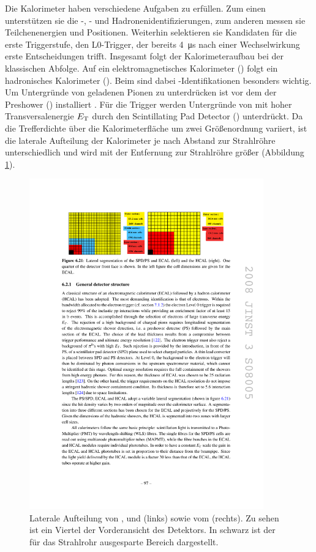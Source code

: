 Die Kalorimeter haben verschiedene Aufgaben zu erfüllen. Zum einen unterstützen sie die \en-, \g- und Hadronenidentifizierungen, zum anderen messen sie Teilchenenergien und Positionen. Weiterhin selektieren sie Kandidaten für die erste Triggerstufe, den L$0$-Trigger, der bereits \SI{4}{\micro s} nach einer Wechselwirkung erste Entscheidungen trifft. Insgesamt folgt der Kalorimeteraufbau bei \lhcb der klassischen Abfolge. Auf ein elektromagnetisches Kalorimeter (\ecal) folgt ein hadronisches Kalorimeter (\hcal). Beim \ecal sind dabei \en-Identifikationen besonders wichtig.\\
Um  Untergründe von geladenen Pionen zu unterdrücken ist vor dem \ecal der Preshower (\presh) installiert . Für die Trigger werden Untergründe von \piz mit hoher Transversalenergie $\mbox{$E_{\rm T}$}$ durch den Scintillating Pad Detector (\spd) unterdrückt.
Da die Trefferdichte über die Kalorimeterfläche um zwei Größenordnung variiert, ist die laterale Aufteilung der Kalorimeter je nach Abstand zur Strahlröhre unterschiedlich und wird mit der Entfernung zur Strahlröhre größer (Abbildung \ref{fig:kalos}).
\begin{figure}[htpb]
	\centering
		\includegraphics[width=0.9\textwidth]{fig/kalos.pdf}
	\caption{Laterale Aufteilung von \presh, \spd und \ecal (links) sowie vom \hcal (rechts). Zu sehen ist ein Viertel der Vorderansicht des Detektors. In schwarz ist der für das Strahlrohr ausgesparte Bereich dargestellt. \cite{Alves:2008zz}}
	\label{fig:kalos} 
\end{figure}

